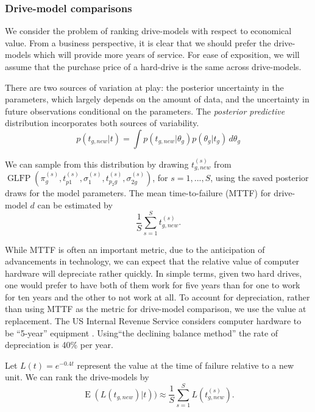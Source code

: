 \documentclass[12pt]{article}
\newcommand{\op}{\operatorname}
\begin{document}
\subsubsection{Drive-model comparisons}
\label{subsubsec:Drive-model comparisons}
We consider the problem of ranking drive-models with respect to economical value. From a
business perspective, it is clear
that we should prefer the drive-models which will provide more years
of service. For ease of exposition, we will assume that the purchase
price of a hard-drive is the same across drive-models.

There are two sources of variation at play: the
posterior uncertainty in the parameters, which largely depends on the
amount of data, and the uncertainty in future
observations conditional on the parameters. The {\em posterior
  predictive} distribution incorporates both sources of variability.
\begin{equation*}
  p(t_{g,new}|t) = \int p(t_{g,new}|\theta_g) p(\theta_g|t_g) \, d\theta_g
\end{equation*}

We can sample from this distribution by drawing $t_{g,new}^{(s)}$ from
$\operatorname{GLFP}(\pi_g^{(s)},
t_{p1}^{(s)},\sigma_1^{(s)},t_{p_{2}g}^{(s)},\sigma_{2g}^{(s)})$, for
$s=1,...,S$, using the saved posterior draws for the model
parameters. The mean time-to-failure (MTTF) for drive-model $d$ can be estimated by
$$\frac{1}{S} \sum_{s=1}^{S} t_{g,new}^{(s)}.$$

While MTTF is often an important metric, due to the
anticipation of advancements in technology, we can expect that the
relative value of computer hardware will depreciate rather quickly. In simple terms, given two hard drives, one would prefer to have both of them work for five years than for one to work for ten years and the other to not work at all. To account
for depreciation, rather than using MTTF as the metric for drive-model comparison, we use the value at replacement. The US Internal Revenue Service considers
computer hardware to be ``5-year'' equipment \citep{f4562}. Using``the declining
balance method'' the rate of depreciation is 40\% per year.

Let $L(t) = e^{-0.4t}$ represent the value at the time of failure
relative to a new unit. We can rank the drive-models by 
$$\op{E}(L(t_{g,new})|t))\approx \frac{1}{S} \sum_{s=1}^{S} L(t_{g,new}^{(s)}).$$
\end{document}

